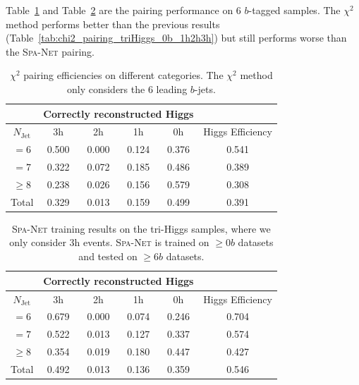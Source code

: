 \documentclass[12pt]{article}
\begin{document}
	Table~\ref{tab:chi2_pairing_triHiggs_6b_3h} and Table~\ref{tab:SPANet_triHiggs_6b_3h} are the pairing performance on 6 $b$-tagged samples. The $\chi^2$ method performs better than the previous results (Table~\ref{tab:chi2_pairing_triHiggs_0b_1h2h3h}) but still performs worse than the \textsc{Spa-Net} pairing.
	\begin{table}[htpb]
		\centering
		\caption{$\chi^2$ pairing efficiencies on different categories. The $\chi^2$ method only considers the 6 leading $b$-jets.}
		\label{tab:chi2_pairing_triHiggs_6b_3h}
		\begin{tabular}{c|cccc|c}
			\multicolumn{1}{l|}{} & \multicolumn{4}{c|}{Correctly reconstructed Higgs} & \multicolumn{1}{l}{} \\ \hline
			$N_\text{Jet}$        & 3h          & 2h         & 1h         & 0h         & Higgs Efficiency     \\ \hline
			$=6$                  & 0.500       & 0.000      & 0.124      & 0.376      & 0.541                \\
			$=7$                  & 0.322       & 0.072      & 0.185      & 0.486      & 0.389                \\
			$\ge 8$               & 0.238       & 0.026      & 0.156      & 0.579      & 0.308                \\ \hline
			Total                 & 0.329       & 0.013      & 0.159      & 0.499      & 0.391               
		\end{tabular}
	\end{table}
	\begin{table}[htpb]
		\centering
		\caption{\textsc{Spa-Net} training results on the tri-Higgs samples, where we only consider 3h events. \textsc{Spa-Net} is trained on $\ge 0b$ datasets and tested on $\ge 6b$ datasets.}
		\label{tab:SPANet_triHiggs_6b_3h}
		\begin{tabular}{c|cccc|c}
			\multicolumn{1}{l|}{} & \multicolumn{4}{c|}{Correctly reconstructed Higgs} & \multicolumn{1}{l}{} \\ \hline
			$N_\text{Jet}$        & 3h          & 2h         & 1h         & 0h         & Higgs Efficiency     \\ \hline
			$=6$                  & 0.679       & 0.000      & 0.074      & 0.246      & 0.704                \\
			$=7$                  & 0.522       & 0.013      & 0.127      & 0.337      & 0.574                \\
			$\ge 8$               & 0.354       & 0.019      & 0.180      & 0.447      & 0.427                \\ \hline
			Total                 & 0.492       & 0.013      & 0.136      & 0.359      & 0.546               
		\end{tabular}
	\end{table}
\end{document}
